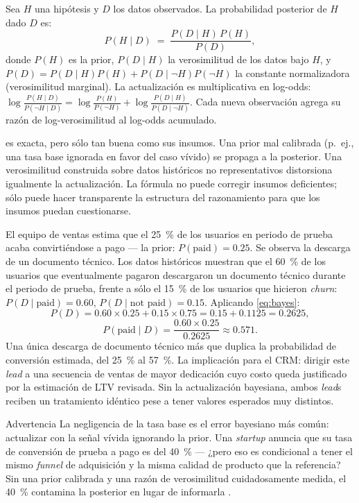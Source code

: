 Sea \(H\) una hipótesis y \(D\) los datos observados. La probabilidad posterior de \(H\) dado \(D\) es:
\begin{equation}\label{eq:bayes}
  P(H \mid D) \;=\; \frac{P(D \mid H)\,P(H)}{P(D)},
\end{equation}
donde \(P(H)\) es la prior, \(P(D \mid H)\) la verosimilitud de los datos bajo \(H\), y
\(P(D)=P(D\mid H)P(H)+P(D\mid \neg H)P(\neg H)\) la constante normalizadora (verosimilitud marginal).
La actualización es multiplicativa en log-odds: \(\log\frac{P(H\mid D)}{P(\neg H\mid D)} =
\log\frac{P(H)}{P(\neg H)} + \log\frac{P(D\mid H)}{P(D\mid \neg H)}\). Cada nueva observación
agrega su razón de log-verosimilitud al log-odds acumulado.

 es exacta, pero sólo tan buena como sus insumos. Una prior mal calibrada (p.\ ej.,
una tasa base ignorada en favor del caso vívido) se propaga a la posterior. Una verosimilitud
construida sobre datos históricos no representativos distorsiona igualmente la actualización. La
fórmula no puede corregir insumos deficientes; sólo puede hacer transparente la estructura del
razonamiento para que los insumos puedan cuestionarse.

\begin{example}
El equipo de ventas estima que el \qty{25}{\percent} de los usuarios en periodo de prueba acaba
convirtiéndose a pago --- la prior: \(P(\text{paid})\!=\!0.25\). Se observa la descarga de un
documento técnico. Los datos históricos muestran que el \qty{60}{\percent} de los usuarios que
eventualmente pagaron descargaron un documento técnico durante el periodo de prueba, frente a sólo
el \qty{15}{\percent} de los usuarios que hicieron \emph{churn}: \(P(D\mid\text{paid})=0.60\),
\(P(D\mid\text{not paid})=0.15\). Aplicando \cref{eq:bayes}:
\[
  P(D) = 0.60\times0.25 + 0.15\times0.75 = 0.15 + 0.1125 = 0.2625,
\]
\[
  P(\text{paid}\mid D) = \frac{0.60\times0.25}{0.2625} \approx 0.571.
\]
Una única descarga de documento técnico más que duplica la probabilidad de conversión estimada, del
\qty{25}{\percent} al \qty{57}{\percent}. La implicación para el CRM: dirigir este \emph{lead} a una
secuencia de ventas de mayor dedicación cuyo costo queda justificado por la estimación de LTV
revisada. Sin la actualización bayesiana, ambos \emph{lead}s reciben un tratamiento idéntico pese a
tener valores esperados muy distintos.
\end{example}

\begin{admonition}{Advertencia}
La negligencia de la tasa base es el error bayesiano más común: actualizar con la señal vívida
ignorando la prior. Una \emph{startup} anuncia que su tasa de conversión de prueba a pago es del
\qty{40}{\percent} --- ¿pero eso es condicional a tener el mismo \emph{funnel} de adquisición y la
misma calidad de producto que la referencia? Sin una prior calibrada y una razón de verosimilitud
cuidadosamente medida, el \qty{40}{\percent} contamina la posterior en lugar de informarla
\parencite{kahneman2011}.
\end{admonition}

